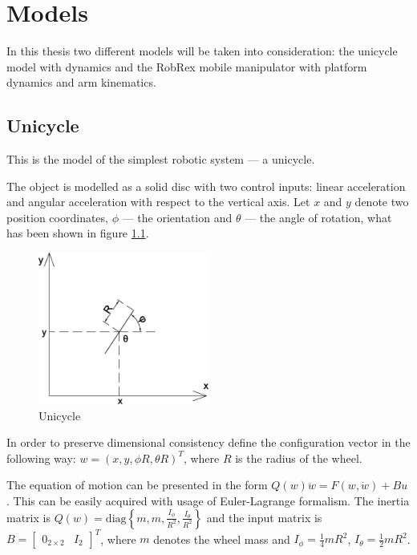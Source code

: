 \chapter{Models}
\label{ch:model}
In this thesis two different models will be taken into consideration: the unicycle model
with dynamics and the RobRex mobile manipulator with platform dynamics and arm kinematics.
\section{Unicycle}
This is the model of the simplest robotic system --- a unicycle.

The object is modelled as a solid disc with two control inputs:
linear acceleration and angular acceleration with respect to the vertical axis.
Let $x$ and $y$ denote two position coordinates, $\phi$ --- the orientation
and $\theta$ --- the angle of rotation, what has been shown in figure \ref{fig:uni_sch}.
\begin{figure}
\centering
\includegraphics[width=0.5\textwidth]{img/uni.eps}
\caption{Unicycle}
\label{fig:uni_sch}
\end{figure}
In order to preserve dimensional consistency define the configuration vector in the following way:
$w = (x, y, \phi R, \theta R)^T$, where $R$ is the radius of the wheel.

The equation of motion can be presented
in the form $Q(w)\ddot w =F(w, \dot w)+Bu$. This can be easily acquired with usage of
Euler-Lagrange formalism. The inertia matrix is
$Q(w)=\mathrm{diag}\left\{m, m, \frac{I_\phi}{R^2}, \frac{I_\theta}{R^2}\right\}$ and
the input matrix is $B=\begin{bmatrix}
0_{2 \times 2} & I_2
\end{bmatrix}^T$, where $m$ denotes the wheel mass and $I_\phi=\frac{1}{4}mR^2$,
$I_\theta=\frac{1}{2}mR^2$.

